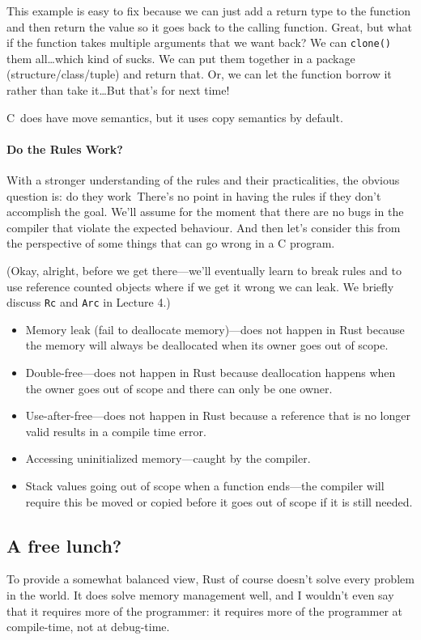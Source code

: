 \documentclass[a4paper]{report}
\newcommand{\CPP}{C\nolinebreak\hspace{-.05em}\raisebox{.4ex}{\tiny\bf +}\nolinebreak\hspace{-.10em}\raisebox{.4ex}{\tiny\bf +}}
\def\CPP{{C\nolinebreak[4]\hspace{-.05em}\raisebox{.4ex}{\tiny\bf ++}}}
\begin{document}
This example is easy to fix because we can just add a return type to the function and then return the value so it goes back to the calling function. Great, but what if the function takes multiple arguments that we want back? We can \texttt{clone()} them all\ldots which kind of sucks. We can put them together in a package (structure/class/tuple) and return that. Or, we can let the function borrow it rather than take it\ldots But that's for next time!

\CPP~does have move semantics, but it uses copy semantics by default.

\paragraph{Do the Rules Work?}
With a stronger understanding of the rules and their practicalities, the obvious question is: do they work\textinterrobang~There's no point in having the rules if they don't accomplish the goal. We'll assume for the moment that there are no bugs in the compiler that violate the expected behaviour. And then let's consider this from the perspective of some things that can go wrong in a C program.

(Okay, alright, before we get there---we'll eventually learn to break rules and to use reference counted objects where if we get it wrong we can leak. We briefly discuss \texttt{Rc} and \texttt{Arc} in Lecture 4.)

\begin{itemize}
	\item Memory leak (fail to deallocate memory)---does not happen in Rust because the memory will always be deallocated when its owner goes out of scope.
	\item Double-free---does not happen in Rust because deallocation happens when the owner goes out of scope and there can only be one owner.
	\item Use-after-free---does not happen in Rust because a reference that is no longer valid results in a compile time error.
	\item Accessing uninitialized memory---caught by the compiler.
	\item Stack values going out of scope when a function ends---the compiler will require this be moved or copied before it goes out of scope if it is still needed.
\end{itemize}

\subsection*{A free lunch?}
To provide a somewhat balanced view, Rust of course doesn't solve every problem
in the world. It does solve memory management well, and I wouldn't even say that
it requires more of the programmer: it requires more of the programmer at compile-time,
not at debug-time.
\end{document}
